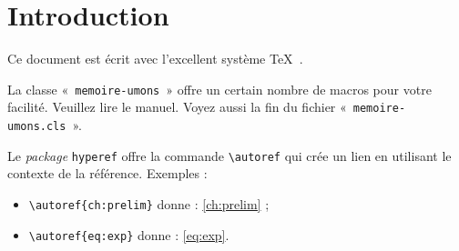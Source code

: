 \chapter{Introduction}

Ce document est écrit avec l'excellent système \TeX\
\autocite{knuth_texbook_1986}.

La classe «~\texttt{memoire-umons}~» offre un certain nombre de macros
pour votre facilité.  Veuillez lire le manuel.  Voyez aussi la fin du
fichier «~\texttt{memoire-\linebreak[2]umons.cls}~».

\bigskip

Le \emph{package} \texttt{hyperef} offre la commande \verb+\autoref+
qui crée un lien en utilisant le contexte de la référence.  Exemples :
\begin{itemize}
\item \verb/\autoref{ch:prelim}/ donne : \autoref{ch:prelim} ;
\item \verb/\autoref{eq:exp}/ donne : \autoref{eq:exp}.
\end{itemize}


